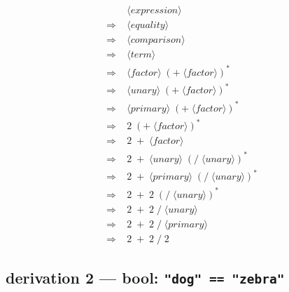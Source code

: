\documentclass[12pt]{article}
\begin{document}
\begin{align*}
&\langle\textit{expression}\rangle \\
\Rightarrow\;&\langle\textit{equality}\rangle \\
\Rightarrow\;&\langle\textit{comparison}\rangle \\
\Rightarrow\;&\langle\textit{term}\rangle \\
\Rightarrow\;&\langle\textit{factor}\rangle\;(+\;\langle\textit{factor}\rangle)^* \\
\Rightarrow\;&\langle\textit{unary}\rangle\;(+\;\langle\textit{factor}\rangle)^* \\
\Rightarrow\;&\langle\textit{primary}\rangle\;(+\;\langle\textit{factor}\rangle)^* \\
\Rightarrow\;&2\;(+\;\langle\textit{factor}\rangle)^* \\
\Rightarrow\;&2\;+\;\langle\textit{factor}\rangle \\
\Rightarrow\;&2\;+\;\langle\textit{unary}\rangle\;(/\;\langle\textit{unary}\rangle)^* \\
\Rightarrow\;&2\;+\;\langle\textit{primary}\rangle\;(/\;\langle\textit{unary}\rangle)^* \\
\Rightarrow\;&2\;+\;2\;(/\;\langle\textit{unary}\rangle)^* \\
\Rightarrow\;&2\;+\;2\;/\;\langle\textit{unary}\rangle \\
\Rightarrow\;&2\;+\;2\;/\;\langle\textit{primary}\rangle \\
\Rightarrow\;&2\;+\;2\;/\;2
\end{align*}


\subsection*{derivation 2 --- bool: \texttt{"dog" == "zebra"}}
\end{document}
